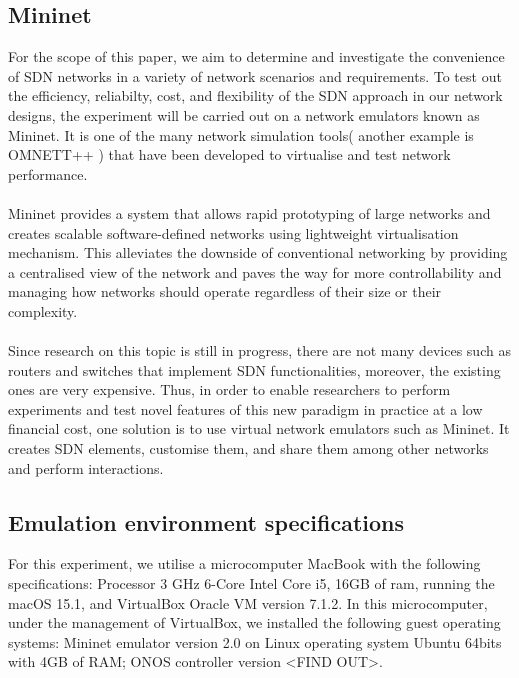 \documentclass{article}
\begin{document}
\subsection{Mininet}
For the scope of this paper, we aim to determine and investigate the convenience of SDN networks in a variety of network scenarios and requirements. To test out the efficiency, reliabilty, cost, and flexibility of the SDN approach in our network designs, the experiment will be carried out on a network emulators known as Mininet. It is one of the many network simulation tools( another example is OMNETT++ ) that have been developed to virtualise and test network performance\cite{10220519, Haji_Zeebaree_Saeed_Ameen_Shukur_Omar_Sadeeq_Ageed_Ibrahim_Yasin_2021}. \\\\ Mininet\cite{6860404} provides a system that allows rapid prototyping of large networks and creates scalable software-defined networks using lightweight virtualisation mechanism. This alleviates the downside of conventional networking by providing a centralised view of the network and paves the way for more controllability and managing how networks should operate regardless of their size or their complexity. \\\\
Since research on this topic is still in progress, there are not many devices such as routers and switches that implement SDN functionalities, moreover, the existing ones are very expensive. Thus, in order to enable researchers to perform experiments and test novel features of this new paradigm in practice at a low financial cost, one solution is to use virtual network emulators such as Mininet. It creates SDN elements, customise them, and share them among other networks and perform interactions\cite{6860404}.

\newpage
\subsection{Emulation environment specifications}
For this experiment, we utilise a microcomputer MacBook with the following specifications: Processor 3 GHz 6-Core Intel Core i5, 16GB of ram, running the macOS 15.1, and VirtualBox Oracle VM version 7.1.2.
In this microcomputer, under the management of VirtualBox, we installed the following guest operating systems: Mininet emulator version 2.0 on Linux operating system Ubuntu 64bits with 4GB of RAM; ONOS controller version <FIND OUT>.
\end{document}
